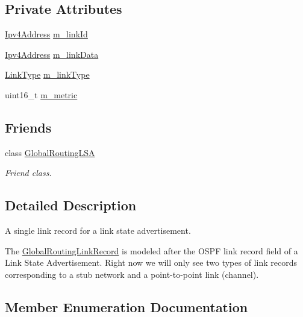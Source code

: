 \subsection*{Private Attributes}
\begin{DoxyCompactItemize}
\item 
\hyperlink{classns3_1_1Ipv4Address}{Ipv4\+Address} \hyperlink{classns3_1_1GlobalRoutingLinkRecord_a55be7d599d645418645cfd2231ce603f}{m\+\_\+link\+Id}
\item 
\hyperlink{classns3_1_1Ipv4Address}{Ipv4\+Address} \hyperlink{classns3_1_1GlobalRoutingLinkRecord_a62c1a677af17f0fd5fa783a17ce4f565}{m\+\_\+link\+Data}
\item 
\hyperlink{classns3_1_1GlobalRoutingLinkRecord_a9380bcce9bca03943c4761b166a694f4}{Link\+Type} \hyperlink{classns3_1_1GlobalRoutingLinkRecord_a22747eea30dc16e473676af10eac3cfb}{m\+\_\+link\+Type}
\item 
uint16\+\_\+t \hyperlink{classns3_1_1GlobalRoutingLinkRecord_a9f50548fa7db2a1490d0855e0a541e68}{m\+\_\+metric}
\end{DoxyCompactItemize}
\subsection*{Friends}
\begin{DoxyCompactItemize}
\item 
class \hyperlink{classns3_1_1GlobalRoutingLinkRecord_aea7a34c33905cb81b05fc8bfa34f7db9}{Global\+Routing\+L\+SA}
\begin{DoxyCompactList}\small\item\em Friend class. \end{DoxyCompactList}\end{DoxyCompactItemize}


\subsection{Detailed Description}
A single link record for a link state advertisement. 

The \hyperlink{classns3_1_1GlobalRoutingLinkRecord}{Global\+Routing\+Link\+Record} is modeled after the O\+S\+PF link record field of a Link State Advertisement. Right now we will only see two types of link records corresponding to a stub network and a point-\/to-\/point link (channel). 

\subsection{Member Enumeration Documentation}
